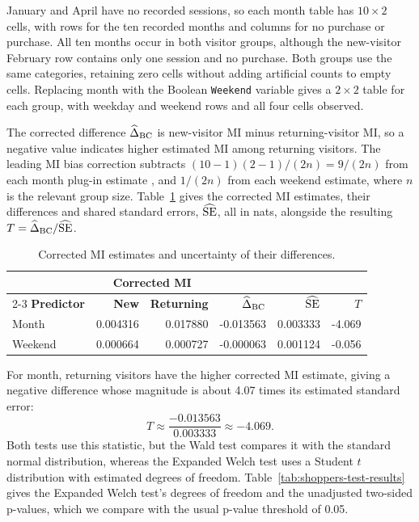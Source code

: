\begingroup
\setlength{\intextsep}{4pt}
\setlength{\abovecaptionskip}{4pt}
January and April have no recorded sessions, so each month table has
\(10\times2\) cells, with rows for the ten recorded months and columns
for no purchase or purchase. All ten months occur in both visitor groups,
although the new-visitor February row contains only one session and no
purchase. Both groups use the same categories, retaining zero cells
without adding artificial counts to empty cells. Replacing month with the
Boolean \texttt{Weekend}
variable gives a \(2\times2\) table for each group, with weekday and
weekend rows and all four cells observed.

The corrected difference \(\widehat\Delta_{\mathrm{BC}}\) is new-visitor MI minus
returning-visitor MI, so a negative value indicates higher estimated MI
among returning visitors. The leading MI bias correction subtracts
\((10-1)(2-1)/(2n)=9/(2n)\) from each month plug-in estimate
\citep{miller1955,moddemeijer1989}, and \(1/(2n)\) from each weekend
estimate, where \(n\) is the relevant group size.
Table~\ref{tab:shoppers-application} gives the corrected MI estimates,
their differences and shared standard errors, \(\widehat{\operatorname{SE}}\), all in nats,
alongside the resulting \(T=\widehat\Delta_{\mathrm{BC}}/\widehat{\operatorname{SE}}\).

\begin{table}[H]
\centering
\caption{Corrected MI estimates and uncertainty of their differences.}
\label{tab:shoppers-application}
\thesistableformat
\begin{tabular*}{\textwidth}{@{\extracolsep{\fill}}lrrrrr@{}}
\toprule
 & \multicolumn{2}{c}{\textbf{Corrected MI}} & & & \\
\cmidrule(lr){2-3}
\textbf{Predictor} & \textbf{New} & \textbf{Returning} & \(\widehat\Delta_{\mathrm{BC}}\) & \(\widehat{\operatorname{SE}}\) & \(T\)\\
\midrule
Month & 0.004316 & 0.017880 & -0.013563 & 0.003333 & -4.069\\
\addlinespace[0.35em]
Weekend & 0.000664 & 0.000727 & -0.000063 & 0.001124 & -0.056\\
\bottomrule
\end{tabular*}
\end{table}

For month, returning visitors have the higher corrected MI estimate,
giving a negative difference whose magnitude is about 4.07 times its
estimated standard error:
\begin{equation}
  T\approx\frac{-0.013563}{0.003333}\approx-4.069.
  \label{eq:shoppers-month-statistic}
\end{equation}
Both tests use this statistic, but the Wald test compares it with the
standard normal distribution, whereas the Expanded Welch test uses a Student
\(t\) distribution with estimated degrees of freedom.
Table~\ref{tab:shoppers-test-results} gives the Expanded Welch test's degrees of freedom and the unadjusted two-sided p-values, which we compare with
the usual p-value threshold of 0.05.


